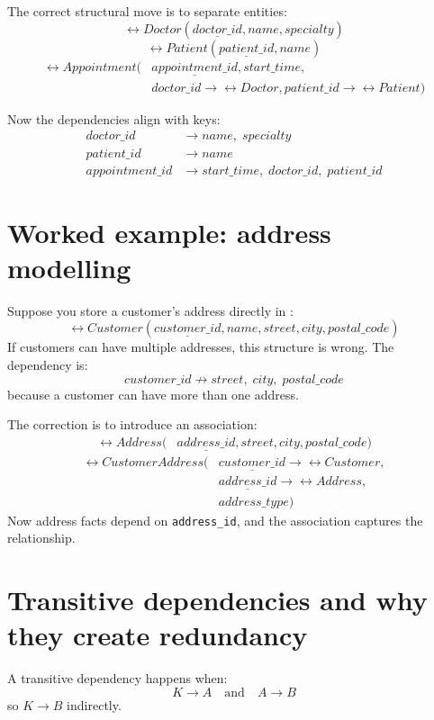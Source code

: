The correct structural move is to separate entities:
\[
\rel{Doctor}(\underline{doctor\_id}, name, specialty)
\]
\[
\rel{Patient}(\underline{patient\_id}, name)
\]
\[
\begin{aligned}
\rel{Appointment}(&\underline{appointment\_id}, start\_time, \\
&doctor\_id \rightarrow \rel{Doctor}, patient\_id \rightarrow \rel{Patient})
\end{aligned}
\]

Now the dependencies align with keys:
\[
\begin{aligned}
doctor\_id &\rightarrow name,\; specialty \\
patient\_id &\rightarrow name \\
appointment\_id &\rightarrow start\_time,\; doctor\_id,\; patient\_id
\end{aligned}
\]

\section{Worked example: address modelling}
Suppose you store a customer’s address directly in :
\[
\rel{Customer}(\underline{customer\_id}, name, street, city, postal\_code)
\]
If customers can have multiple addresses, this structure is wrong.
The dependency is:
\[
customer\_id \nrightarrow street,\; city,\; postal\_code
\]
because a customer can have more than one address.

The correction is to introduce an association:
\[
\begin{aligned}
\rel{Address}(&\underline{address\_id}, street, city, postal\_code)
\end{aligned}
\]
\[
\begin{aligned}
\rel{CustomerAddress}(&\underline{customer\_id} \rightarrow \rel{Customer}, \\
&\underline{address\_id} \rightarrow \rel{Address}, \\
&address\_type)
\end{aligned}
\]
Now address facts depend on \texttt{address\_id}, and the association captures the relationship.

\section{Transitive dependencies and why they create redundancy}
A transitive dependency happens when:
\[
K \rightarrow A
\quad \text{and} \quad
A \rightarrow B
\]
so \(K \rightarrow B\) indirectly.

